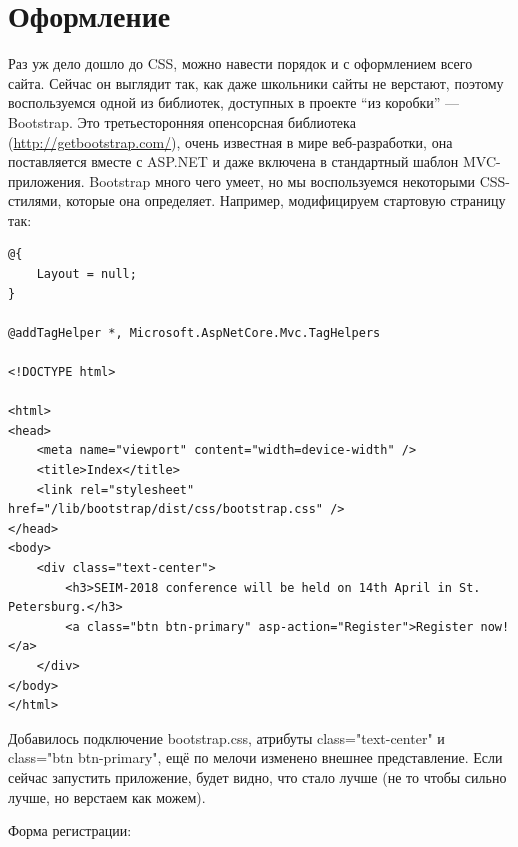 \documentclass[a5paper]{article}
\begin{document}
\section{Оформление}

Раз уж дело дошло до CSS, можно навести порядок и с оформлением всего сайта. Сейчас он выглядит так, как даже школьники сайты не верстают, поэтому воспользуемся одной из библиотек, доступных в проекте ``из коробки'' --- Bootstrap. Это третьесторонняя опенсорсная библиотека 
(\url{http://getbootstrap.com/}), очень известная в мире веб-разработки, она поставляется вместе с ASP.NET и даже включена в стандартный шаблон MVC-приложения. Bootstrap много чего умеет, но мы воспользуемся некоторыми CSS-стилями, которые она определяет. Например, модифицируем
стартовую страницу так:

\begin{verbatim}
@{
    Layout = null;
}

@addTagHelper *, Microsoft.AspNetCore.Mvc.TagHelpers

<!DOCTYPE html>

<html>
<head>
    <meta name="viewport" content="width=device-width" />
    <title>Index</title>
    <link rel="stylesheet" href="/lib/bootstrap/dist/css/bootstrap.css" />
</head>
<body>
    <div class="text-center">
        <h3>SEIM-2018 conference will be held on 14th April in St. Petersburg.</h3>
        <a class="btn btn-primary" asp-action="Register">Register now!</a>
    </div>
</body>
</html>
\end{verbatim}

Добавилось подключение bootstrap.css, атрибуты class="text-center" и class="btn btn-primary", ещё по мелочи изменено внешнее представление. Если сейчас запустить приложение, будет видно, что стало лучше (не то чтобы сильно лучше, но верстаем как можем).

Форма регистрации:
\end{document}
